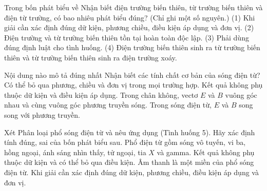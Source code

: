 \begin{ex}
Trong bốn phát biểu về Nhận biết điện trường biến thiên, từ trường biến thiên và điện từ trường, có bao nhiêu phát biểu đúng? (Chỉ ghi một số nguyên.) (1) Khi giải cần xác định đúng dữ kiện, phương chiều, điều kiện áp dụng và đơn vị. (2) Điện trường và từ trường biến thiên tồn tại hoàn toàn độc lập. (3) Phải dùng đúng định luật cho tình huống. (4) Điện trường biến thiên sinh ra từ trường biến thiên và từ trường biến thiên sinh ra điện trường xoáy.
\end{ex}

\begin{ex}
Nội dung nào mô tả đúng nhất Nhận biết các tính chất cơ bản của sóng điện từ?
\choice
{Có thể bỏ qua phương, chiều và đơn vị trong mọi trường hợp.}
{Kết quả không phụ thuộc dữ kiện và điều kiện áp dụng.}
{\True Trong chân không, vectơ $E$ và $B$ vuông góc nhau và cùng vuông góc phương truyền sóng.}
{Trong sóng điện từ, $E$ và $B$ song song với phương truyền.}
\end{ex}

\begin{ex}
Xét Phân loại phổ sóng điện từ và nêu ứng dụng (Tình huống 5). Hãy xác định tính đúng, sai của bốn phát biểu sau.
\choiceTF
{\True Phổ điện từ gồm sóng vô tuyến, vi ba, hồng ngoại, ánh sáng nhìn thấy, tử ngoại, tia $X$ và gamma.}
{Kết quả không phụ thuộc dữ kiện và có thể bỏ qua điều kiện.}
{Âm thanh là một miền của phổ sóng điện từ.}
{\True Khi giải cần xác định đúng dữ kiện, phương chiều, điều kiện áp dụng và đơn vị.}
\end{ex}

